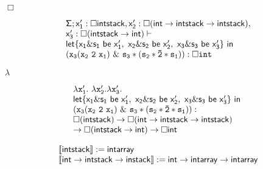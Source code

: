 \documentclass[10pt]{book}
\begin{document}
\begin{mdSnippets}
\begin{mdInlineSnippet}[c3880bc63c2b0fd10cdc024cf76a1924]%
$\Box$\end{mdInlineSnippet}%
\begin{mdDisplaySnippet}[ad876f09899194c52ba4252a80fbe94e]%
\[%
\begin{array}{l}
{\sf \Sigma}; {\sf {x_1^{\prime}:\Box intstack ,x_2^{\prime}:\Box(int\rightarrow intstack\rightarrow intstack)}},\\
   {\sf x_3^{\prime}: \Box  (intstack\rightarrow int)}\vdash \\
        {\sf  let\{ x_1\& s_1 {\ \sf be \ } x_1^{\prime},
         \ x_2\& s_2 {\ \sf be \ } x_2^{\prime}, \  x_3\& s_3 
         {\ \sf be \ } x_3^{\prime} \}\  in}\ \\   
         \mathtt{(x_3 (x_2\ 2 \ x_1)\ \& \ s_3*(s_2* \bar{2}*s_1)):\Box int} 
\end{array}
\]%
\end{mdDisplaySnippet}%
\begin{mdInlineSnippet}[c6a6eb61fd9c6c913da73b3642ca147d]%
$\lambda$\end{mdInlineSnippet}%
\begin{mdDisplaySnippet}[7a9876cc038542e0a4c2b6670b27bd40]%
\[%
\begin{array}{l l}
\mathtt{\lambda x_1^{\prime}.\  \lambda x_2^{\prime}. \lambda x_3^{\prime}}. \\
                 {\sf  let\{ x_1\& s_1 {\ \sf be \ } x_1^{\prime},
       \ x_2\& s_2 {\ \sf be \ } x_2^{\prime}, \  x_3\& s_3 
       {\ \sf be \ } x_3^{\prime} \}\  in}\ \\   
       \mathtt{(x_3 (x_2\ 2 \ x_1)\ \& \ s_3*(s_2* \bar{2}*s_1)):}\\
           {\sf \Box(intstack)\rightarrow 
            \Box(int\rightarrow intstack\rightarrow intstack)} \\
           {\sf \rightarrow \Box (intstack\rightarrow int) \rightarrow \Box int}
\end{array}
\]%
\end{mdDisplaySnippet}%
\begin{mdDisplaySnippet}[97210db0216d148c80d2a671ff4f1a84]%
\[%
  \begin{array}{l}
  \llbracket {\sf intstack} \rrbracket:= {\sf intarray} \\  
  \llbracket {\sf int \rightarrow intstack\rightarrow instack } \rrbracket:= {\sf int \rightarrow intarray\rightarrow intarray} \\

\end{array}\]
\end{mdDisplaySnippet}
\end{mdSnippets}
\end{document}
